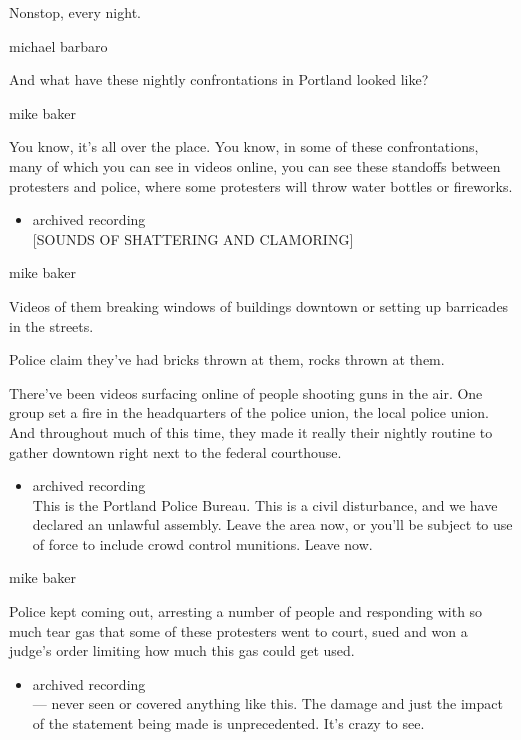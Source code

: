 Nonstop, every night.

michael barbaro

And what have these nightly confrontations in Portland looked like?

mike baker

You know, it's all over the place. You know, in some of these
confrontations, many of which you can see in videos online, you can see
these standoffs between protesters and police, where some protesters
will throw water bottles or fireworks.

\begin{itemize}
\tightlist
\item
  archived recording\\
  {[}SOUNDS OF SHATTERING AND CLAMORING{]}
\end{itemize}

mike baker

Videos of them breaking windows of buildings downtown or setting up
barricades in the streets.

Police claim they've had bricks thrown at them, rocks thrown at them.

There've been videos surfacing online of people shooting guns in the
air. One group set a fire in the headquarters of the police union, the
local police union. And throughout much of this time, they made it
really their nightly routine to gather downtown right next to the
federal courthouse.

\begin{itemize}
\tightlist
\item
  archived recording\\
  This is the Portland Police Bureau. This is a civil disturbance, and
  we have declared an unlawful assembly. Leave the area now, or you'll
  be subject to use of force to include crowd control munitions. Leave
  now.
\end{itemize}

mike baker

Police kept coming out, arresting a number of people and responding with
so much tear gas that some of these protesters went to court, sued and
won a judge's order limiting how much this gas could get used.

\begin{itemize}
\tightlist
\item
  archived recording\\
  --- never seen or covered anything like this. The damage and just the
  impact of the statement being made is unprecedented. It's crazy to
  see.
\end{itemize}


